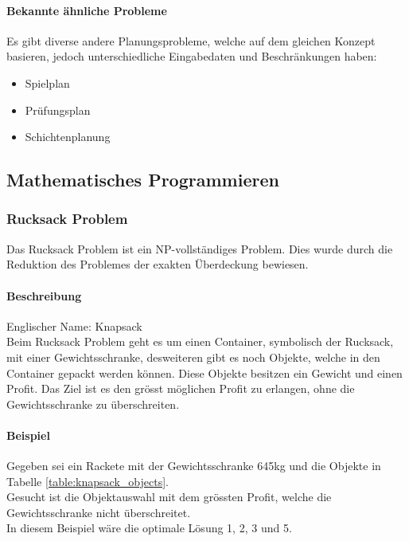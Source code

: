 	\paragraph{Bekannte ähnliche Probleme}	
	Es gibt diverse andere Planungsprobleme, welche auf dem gleichen Konzept basieren, jedoch unterschiedliche Eingabedaten und Beschränkungen haben:
	\begin{itemize}
		\item Spielplan
		\item Prüfungsplan
		\item Schichtenplanung
	\end{itemize}

\newpage
\subsection{Mathematisches Programmieren}\label{mathematical_programming}

	\subsubsection{Rucksack Problem}\label{knapsack}
	Das Rucksack Problem ist ein NP-vollständiges Problem. Dies wurde durch die Reduktion des Problemes der exakten Überdeckung bewiesen.

	\paragraph{Beschreibung}
	Englischer Name: Knapsack\\
	Beim Rucksack Problem geht es um einen Container, symbolisch der Rucksack, mit einer Gewichtsschranke, desweiteren gibt es noch Objekte, welche in den Container gepackt werden können. Diese Objekte besitzen ein Gewicht und einen Profit. Das Ziel ist es den grösst möglichen Profit zu erlangen, ohne die Gewichtsschranke zu überschreiten. \cite{knapsack_desc_web}

	\paragraph{Beispiel} Gegeben sei ein Rackete mit der Gewichtsschranke 645kg und die Objekte in Tabelle \ref{table:knapsack_objects}.\\
Gesucht ist die Objektauswahl mit dem grössten Profit, welche die Gewichtsschranke nicht überschreitet.\\
In diesem Beispiel wäre die optimale Lösung 1, 2, 3 und 5. \cite{knapsack_desc_web}

